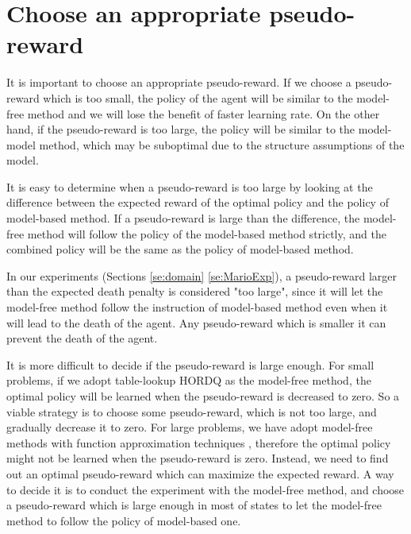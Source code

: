 


\section{Choose an appropriate pseudo-reward}
It is important to choose an appropriate pseudo-reward. If we choose a pseudo-reward which is too small, 
the policy of the agent will be similar to the model-free method and we will lose the 
benefit of faster learning rate. On the other hand, if the pseudo-reward is too large, 
the policy will be similar to the model-model method, which may be suboptimal due
to the structure assumptions of the model.

It is easy to determine when a pseudo-reward is too large by
looking at the difference between the expected reward of the optimal policy and the policy of model-based method.
If a pseudo-reward is large than the difference, the model-free method will follow the policy
of the model-based method strictly, and the combined policy will be the same as 
the policy of model-based method.

In our experiments (Sections \ref{se:domain} \ref{se:MarioExp}), a pseudo-reward larger than the expected death penalty is considered "too large", 
since it will let the model-free method follow the instruction of model-based method even 
when it will lead to the death of the agent. Any pseudo-reward which is smaller it can prevent the
death of the agent.

It is more difficult to decide if the pseudo-reward is large enough. 
For small problems, if we adopt table-lookup HORDQ as the model-free method,
the optimal policy will be learned when the pseudo-reward is decreased to zero.
So a viable strategy is to choose some pseudo-reward, which is not too large, and
gradually decrease it to zero.
For large problems, we have adopt model-free methods with function approximation techniques
, therefore the optimal policy might not be learned when the pseudo-reward is zero.
Instead, we need to find out an optimal pseudo-reward which can maximize the expected reward.
A way to decide it is to conduct the experiment with the model-free method,
and choose a pseudo-reward which is large enough in most of states to let
the model-free method to follow the policy of model-based one.

